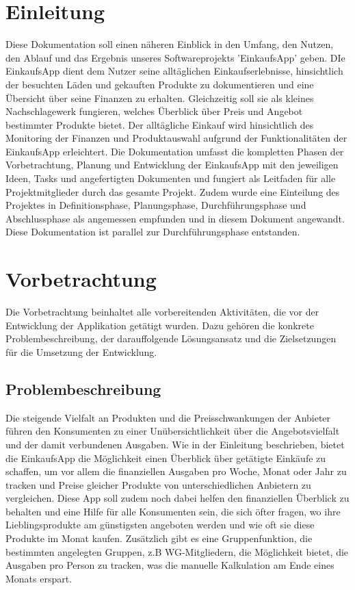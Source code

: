 \documentclass[12pt,a4paper]{article}
\begin{document}
\section*{Einleitung}
Diese Dokumentation soll einen näheren Einblick in den Umfang, den Nutzen, den Ablauf und das Ergebnis unseres Softwareprojekts 'EinkaufsApp' geben.  
\newline
DIe EinkaufsApp dient dem Nutzer seine alltäglichen Einkaufserlebnisse, hinsichtlich der besuchten Läden und gekauften Produkte zu dokumentieren und eine Übersicht über seine Finanzen zu erhalten.
Gleichzeitig soll sie als kleines Nachschlagewerk fungieren, welches Überblick über Preis und Angebot bestimmter Produkte bietet.
Der alltägliche Einkauf wird hinsichtlich des Monitoring der Finanzen und Produktauswahl aufgrund der Funktionalitäten der EinkaufsApp erleichtert.
\newline
Die Dokumentation umfasst die kompletten Phasen der Vorbetrachtung, Planung und Entwicklung der EinkaufsApp mit den jeweiligen Ideen, Tasks und angefertigten Dokumenten und fungiert als Leitfaden für alle Projektmitglieder durch das gesamte Projekt.
\newline
Zudem wurde eine Einteilung des Projektes in Definitionsphase, Planungsphase, Durchführungsphase und Abschlussphase als angemessen empfunden und in diesem Dokument angewandt.
Diese Dokumentation ist parallel zur Durchführungsphase entstanden.

\newpage
\section{Vorbetrachtung}
Die Vorbetrachtung beinhaltet alle vorbereitenden Aktivitäten, die vor der Entwicklung der Applikation getätigt wurden. Dazu gehören die konkrete Problembeschreibung, der darauffolgende Lösungsansatz und die Zielsetzungen für die Umsetzung der Entwicklung.


\subsection{Problembeschreibung}
Die steigende Vielfalt an Produkten und die Preisschwankungen der Anbieter führen den Konsumenten zu einer Unübersichtlichkeit über die Angebotsvielfalt und der damit verbundenen Ausgaben.
Wie in der Einleitung beschrieben, bietet die EinkaufsApp die Möglichkeit einen Überblick über getätigte Einkäufe zu schaffen,
um vor allem die finanziellen Ausgaben pro Woche, Monat oder Jahr zu tracken und Preise gleicher Produkte von unterschiedlichen Anbietern zu vergleichen.  
Diese App soll zudem noch dabei helfen den finanziellen Überblick zu behalten und eine Hilfe für alle Konsumenten sein, die sich öfter fragen, wo ihre Lieblingsprodukte am günstigsten angeboten werden und wie oft sie diese Produkte im Monat kaufen.
Zusätzlich gibt es eine Gruppenfunktion, die bestimmten angelegten Gruppen, z.B WG-Mitgliedern, die Möglichkeit bietet, die Ausgaben pro Person zu tracken, was die manuelle Kalkulation am Ende eines Monats erspart. 
\end{document}
